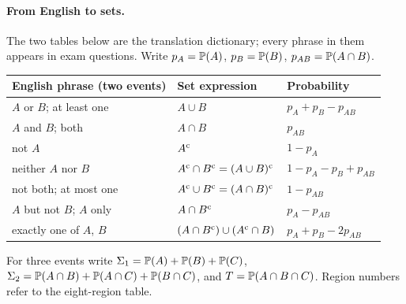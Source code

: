 \paragraph{From English to sets.}
The two tables below are the translation dictionary; every phrase in them appears
in exam questions. Write $p_A = \mathbb{P}(A)$, $p_B = \mathbb{P}(B)$, $p_{AB} = \mathbb{P}(A \cap B)$.
\begin{center}
\begin{tabular}{@{}lll@{}}
\toprule
English phrase (two events) & Set expression & Probability \\
\midrule
$A$ or $B$; at least one            & $A \cup B$                                 & $p_A + p_B - p_{AB}$ \\
$A$ and $B$; both                   & $A \cap B$                                 & $p_{AB}$ \\
not $A$                             & $A^{\mathrm{c}}$                                   & $1 - p_A$ \\
neither $A$ nor $B$                 & $A^{\mathrm{c}} \cap B^{\mathrm{c}} = (A\cup B)^{\mathrm{c}}$      & $1 - p_A - p_B + p_{AB}$ \\
not both; at most one               & $A^{\mathrm{c}} \cup B^{\mathrm{c}} = (A\cap B)^{\mathrm{c}}$      & $1 - p_{AB}$ \\
$A$ but not $B$; $A$ only           & $A \cap B^{\mathrm{c}}$                            & $p_A - p_{AB}$ \\
exactly one of $A$, $B$             & $(A\cap B^{\mathrm{c}}) \cup (A^{\mathrm{c}}\cap B)$        & $p_A + p_B - 2p_{AB}$ \\
\bottomrule
\end{tabular}
\end{center}
For three events write $\Sigma_1 = \mathbb{P}(A)+\mathbb{P}(B)+\mathbb{P}(C)$,
$\Sigma_2 = \mathbb{P}(A\cap B)+\mathbb{P}(A\cap C)+\mathbb{P}(B\cap C)$, and
$T = \mathbb{P}(A\cap B\cap C)$. Region numbers refer to the eight-region table.
